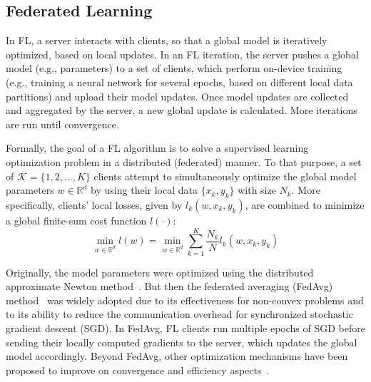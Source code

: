 \documentclass[10pt,journal,compsoc]{IEEEtran}
\begin{document}
\subsection{Federated Learning}
\label{section:federated_learning}

In FL, a server interacts with clients, so that a global model is iteratively optimized, based on local updates. In an FL iteration, the server pushes a global model (e.g., parameters) to a set of clients, which perform on-device training (e.g., training a neural network for several epochs, based on different local data partitions) and upload their model updates. Once model updates are collected and aggregated by the server, a new global update is calculated. More iterations are run until convergence.

Formally, the goal of a FL algorithm is to solve a supervised learning optimization problem in a distributed (federated) manner. To that purpose, a set of $\mathcal{K}=\{1,2,...,K\}$ clients attempt to simultaneously optimize the global model parameters $w\in \mathbb{R}^d$ by using their local data $\{x_k,y_k\}$ with size $N_k$. More specifically, clients' local losses, given by $l_k(w,x_k,y_k)$, are combined to minimize a global finite-sum cost function $l(\cdot)$:
\begin{equation}
\min_{w\in \mathbb{R}^d} l(w) = \min_{w\in \mathbb{R}^d} \sum_{k=1}^{K} \frac{N_k}{N} l_k(w,x_k,y_k)
\label{eq:1}
\end{equation}

Originally, the model parameters were optimized using the distributed approximate Newton method~\cite{konevcny2016federated}. But then the federated averaging (FedAvg) method~\cite{mcmahan2017communication} was widely adopted due to its effectiveness for non-convex problems and to its ability to reduce the communication overhead for synchronized stochastic gradient descent (SGD). In FedAvg, FL clients run multiple epochs of SGD before sending their locally computed gradients to the server, which updates the global model accordingly. Beyond FedAvg, other optimization mechanisms have been proposed to improve on convergence and efficiency aspects~\cite{reddi2020adaptive}.
\end{document}
